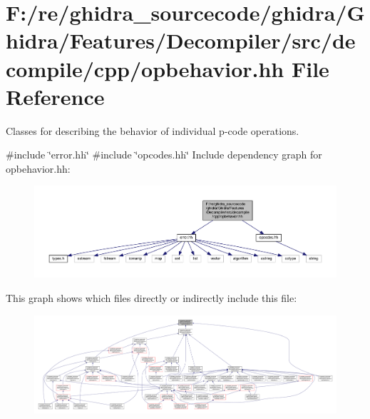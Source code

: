 \hypertarget{opbehavior_8hh}{}\section{F\+:/re/ghidra\+\_\+sourcecode/ghidra/\+Ghidra/\+Features/\+Decompiler/src/decompile/cpp/opbehavior.hh File Reference}
\label{opbehavior_8hh}


Classes for describing the behavior of individual p-\/code operations.  


{\ttfamily \#include \char`\"{}error.\+hh\char`\"{}}\newline
{\ttfamily \#include \char`\"{}opcodes.\+hh\char`\"{}}\newline
Include dependency graph for opbehavior.\+hh\+:
\nopagebreak
\begin{figure}[H]
\begin{center}
\leavevmode
\includegraphics[width=350pt]{opbehavior_8hh__incl}
\end{center}
\end{figure}
This graph shows which files directly or indirectly include this file\+:
\nopagebreak
\begin{figure}[H]
\begin{center}
\leavevmode
\includegraphics[width=350pt]{opbehavior_8hh__dep__incl}
\end{center}
\end{figure}
